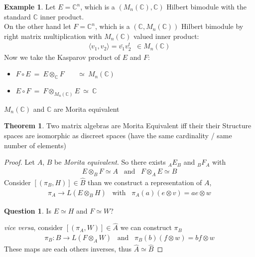 \documentclass[a4paper]{article}
\theoremstyle{definition}
\theoremstyle{definition}
\newtheorem{question}{Question}
\theoremstyle{definition}
\newtheorem{example}{Example}
\theoremstyle{theorem}
\newtheorem{theorem}{Theorem}
\theoremstyle{theorem}
\theoremstyle{theorem}
\theoremstyle{definition}
\begin{document}
\begin{example}
    Let $E = \mathbb{C}^n$, which is a $(M_n(\mathbb{C}), \mathbb{C})$ Hilbert bimodule with the
    standard $\mathbb{C}$ inner product.\\
    On the other hand let $F = \mathbb{C}^n$, which is a $(\mathbb{C}, M_n(\mathbb{C}))$ Hilbert
    bimodule by right matrix multiplication with $M_n(\mathbb{C})$ valued inner product:
    \begin{align*}
        \langle v_1, v_2\rangle =\bar{v_1}v_2^t \;\; \in M_n(\mathbb{C})
    \end{align*}
    Now we take the Kasparov product of $E$ and $F$:
   \begin{itemize}
        \item $F\circ E\ =\  E\otimes _{\mathbb{C}}F\ \;\;\;\;\;\; \simeq \  M_n(\mathbb{C})$
        \item $E\circ F\ =\ F\otimes _{M_n(\mathbb{C})}E\ \simeq\ \mathbb{C}$
    \end{itemize}
    $M_n(\mathbb{C})$ and $\mathbb{C}$ are Morita equivalent
\end{example}

\begin{theorem}
    Two matrix algebras are Morita Equivalent iff their their Structure spaces
    are isomorphic as discreet spaces (have the same cardinality / same number of elements)
\end{theorem}
\begin{proof}
    Let $A$, $B$ be \textit{Morita equivalent}. So there exists $_A E_B$ and $_B F_A$ with
    \begin{align*}
        E \otimes _B F \simeq A \;\;\; \text{and} \;\;\; F \otimes _A E \simeq B
    \end{align*}
    Consider $[(\pi _B, H)] \in \hat{B}$ than we construct a representation of $A$,
    \begin{align*}
        \pi _A \rightarrow L(E \otimes _B H)\;\;\; \text{with} \;\;\; \pi _A(a) (e \otimes v) = a e \otimes w
    \end{align*}
    \begin{question}
        Is $E \simeq H$ and $F \simeq W$?
    \end{question}
    \textit{vice versa}, consider $[(\pi _A, W)] \in \hat{A}$ we can construct $\pi _B$
    \begin{align*}
        \pi _B: B \rightarrow L(F \otimes _A W) \;\;\; \text{and}\;\;\; \pi _B(b) (f\otimes w) = bf\otimes w
    \end{align*}
    These maps are each others inverses, thus $\hat{A} \simeq \hat{B}$
\end{proof}
\end{document}
